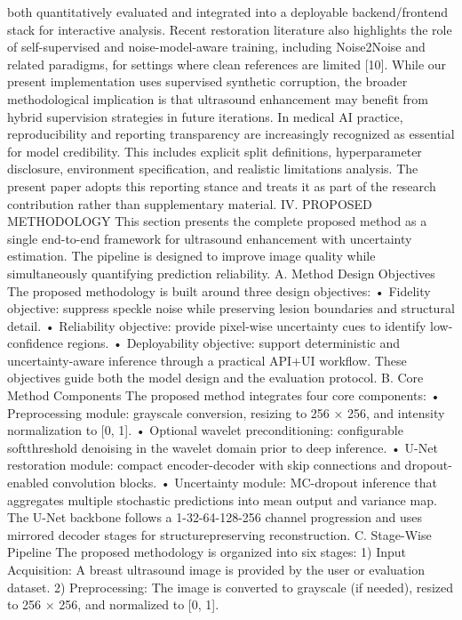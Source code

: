 both quantitatively evaluated and integrated into a deployable
backend/frontend stack for interactive analysis.
Recent restoration literature also highlights the role of
self-supervised and noise-model-aware training, including
Noise2Noise and related paradigms, for settings where clean
references are limited [10]. While our present implementation
uses supervised synthetic corruption, the broader methodological implication is that ultrasound enhancement may benefit
from hybrid supervision strategies in future iterations.
In medical AI practice, reproducibility and reporting transparency are increasingly recognized as essential for model
credibility. This includes explicit split definitions, hyperparameter disclosure, environment specification, and realistic
limitations analysis. The present paper adopts this reporting
stance and treats it as part of the research contribution rather
than supplementary material.
IV. PROPOSED METHODOLOGY
This section presents the complete proposed method as a
single end-to-end framework for ultrasound enhancement with
uncertainty estimation. The pipeline is designed to improve
image quality while simultaneously quantifying prediction
reliability.
A. Method Design Objectives
The proposed methodology is built around three design
objectives:
• Fidelity objective: suppress speckle noise while preserving lesion boundaries and structural detail.
• Reliability objective: provide pixel-wise uncertainty
cues to identify low-confidence regions.
• Deployability objective: support deterministic and
uncertainty-aware inference through a practical API+UI
workflow.
These objectives guide both the model design and the
evaluation protocol.
B. Core Method Components
The proposed method integrates four core components:
• Preprocessing module: grayscale conversion, resizing to
256 × 256, and intensity normalization to [0, 1].
• Optional wavelet preconditioning: configurable softthreshold denoising in the wavelet domain prior to deep
inference.
• U-Net restoration module: compact encoder-decoder
with skip connections and dropout-enabled convolution
blocks.
• Uncertainty module: MC-dropout inference that aggregates multiple stochastic predictions into mean output and
variance map.
The U-Net backbone follows a 1-32-64-128-256 channel
progression and uses mirrored decoder stages for structurepreserving reconstruction.
C. Stage-Wise Pipeline
The proposed methodology is organized into six stages:
1) Input Acquisition: A breast ultrasound image is provided by the user or evaluation dataset.
2) Preprocessing: The image is converted to grayscale (if
needed), resized to 256 × 256, and normalized to [0, 1].
